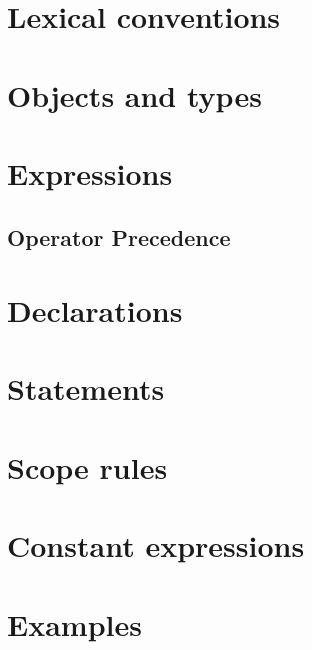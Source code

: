 \section{Lexical conventions}


\section{Objects and types}

\section{Expressions}
\subsection{Operator Precedence}

\section{Declarations}

\section{Statements}

\section{Scope rules}

\section{Constant expressions}

\section{Examples}

